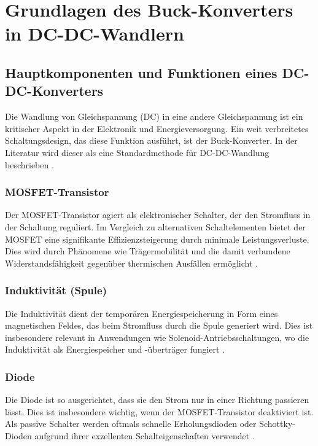 \section{Grundlagen des Buck-Konverters in DC-DC-Wandlern}

\subsection{Hauptkomponenten und Funktionen eines DC-DC-Konverters}

Die Wandlung von Gleichspannung (DC) in eine andere Gleichspannung ist ein kritischer Aspekt in der Elektronik und Energieversorgung. Ein weit verbreitetes Schaltungsdesign, das diese Funktion ausführt, ist der Buck-Konverter. In der Literatur wird dieser als eine Standardmethode für DC-DC-Wandlung beschrieben \cite[p.~66]{wensdesign2022}.



\subsubsection{MOSFET-Transistor}
Der MOSFET-Transistor agiert als elektronischer Schalter, der den Stromfluss in der Schaltung reguliert. Im Vergleich zu alternativen Schaltelementen bietet der MOSFET eine signifikante Effizienzsteigerung durch minimale Leistungsverluste. Dies wird durch Phänomene wie Trägermobilität und die damit verbundene Widerstandsfähigkeit gegenüber thermischen Ausfällen ermöglicht \cite[p.~29]{choi2013pulsewidth}.

\subsubsection{Induktivität (Spule)}
Die Induktivität dient der temporären Energiespeicherung in Form eines magnetischen Feldes, das beim Stromfluss durch die Spule generiert wird. Dies ist insbesondere relevant in Anwendungen wie Solenoid-Antriebsschaltungen, wo die Induktivität als Energiespeicher und -überträger fungiert \cite[p.~54]{choi2013pulsewidth}.

\subsubsection{Diode}
Die Diode ist so ausgerichtet, dass sie den Strom nur in einer Richtung passieren lässt. Dies ist insbesondere wichtig, wenn der MOSFET-Transistor deaktiviert ist. Als passive Schalter werden oftmals schnelle Erholungsdioden oder Schottky-Dioden aufgrund ihrer exzellenten Schalteigenschaften verwendet \cite[p.~29]{choi2013pulsewidth}.

